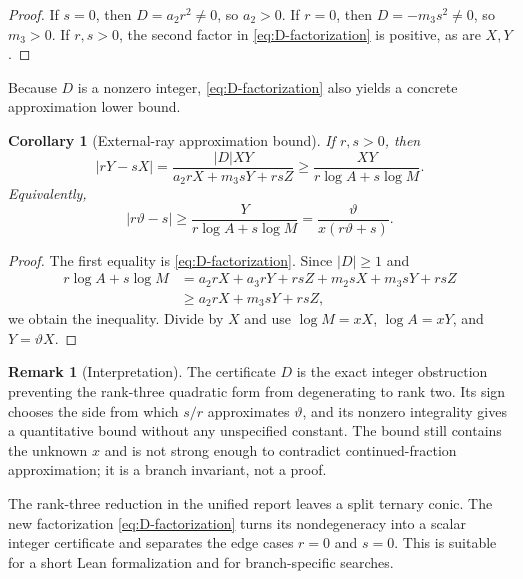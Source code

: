 \documentclass[11pt]{article}
\newtheorem{corollary}[theorem]{Corollary}
\theoremstyle{definition}
\newtheorem{remark}[theorem]{Remark}
\newcommand{\vtheta}{\vartheta}
\begin{document}
\begin{proof}
If $s=0$, then $D=a_2r^2\ne0$, so $a_2>0$.  If $r=0$, then
$D=-m_3s^2\ne0$, so $m_3>0$.  If $r,s>0$, the second factor in
\eqref{eq:D-factorization} is positive, as are $X,Y$.
\end{proof}

Because $D$ is a nonzero integer, \eqref{eq:D-factorization} also yields a concrete
approximation lower bound.

\begin{corollary}[External-ray approximation bound]\label{cor:ray-approx}
If $r,s>0$, then
\begin{equation}\label{eq:ray-approx-raw}
 |rY-sX|
 =\frac{|D|XY}{a_2rX+m_3sY+rsZ}
 \ge \frac{XY}{r\log A+s\log M}.
\end{equation}
Equivalently,
\begin{equation}\label{eq:ray-theta-bound}
 |r\vtheta-s|
 \ge \frac{Y}{r\log A+s\log M}
 =\frac{\vtheta}{x(r\vtheta+s)}.
\end{equation}
\end{corollary}

\begin{proof}
The first equality is \eqref{eq:D-factorization}.  Since $|D|\ge1$ and
\begin{align*}
 r\log A+s\log M
 &=a_2rX+a_3rY+rsZ+m_2sX+m_3sY+rsZ\\
 &\ge a_2rX+m_3sY+rsZ,
\end{align*}
we obtain the inequality.  Divide by $X$ and use
$\log M=xX$, $\log A=xY$, and $Y=\vtheta X$.
\end{proof}

\begin{remark}[Interpretation]
The certificate $D$ is the exact integer obstruction preventing the rank-three quadratic
form from degenerating to rank two.  Its sign chooses the side from which $s/r$
approximates $\vtheta$, and its nonzero integrality gives a quantitative bound without any
unspecified constant.  The bound still contains the unknown $x$ and is not strong enough
to contradict continued-fraction approximation; it is a branch invariant, not a proof.
\end{remark}

\begin{aenovelbox}
The rank-three reduction in the unified report leaves a split ternary conic.  The new
factorization \eqref{eq:D-factorization} turns its nondegeneracy into a scalar integer
certificate and separates the edge cases $r=0$ and $s=0$.  This is suitable for a short
Lean formalization and for branch-specific searches.
\end{aenovelbox}
\end{document}
